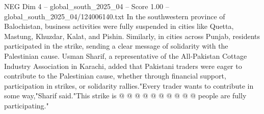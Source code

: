\begin{textsample}{NEG Dim 4 – global\_south\_2025\_04 – Score 1.00 – global\_south\_2025\_04/124006140.txt}
In the southwestern province of Balochistan, business activities were fully suspended in cities like Quetta, Mastung, Khuzdar, Kalat, and Pishin.
Similarly, in cities across Punjab, residents participated in the strike, sending a clear message of solidarity with the Palestinian cause.
Usman Sharif, a representative of the All-Pakistan Cottage Industry Association in Karachi, added that Pakistani traders were eager to contribute to the Palestinian cause, whether through financial support, participation in strikes, or solidarity rallies."Every trader wants to contribute in some way,"Sharif said."This strike is @ @ @ @ @ @ @ @ @ @ people are fully participating."

\end{textsample}
